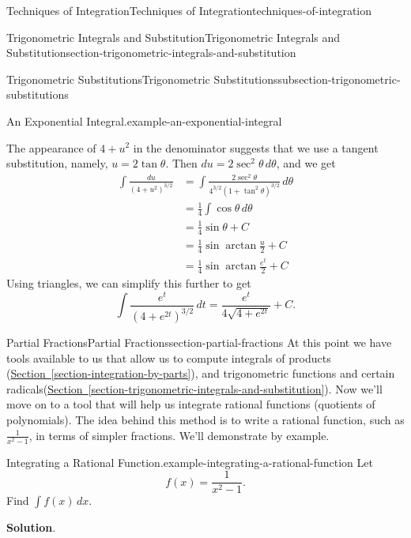 \documentclass[oneside,10pt,]{book}
\numberwithin{equation}{section}
\begin{document}
\begin{chapterptx}{Techniques of Integration}{}{Techniques of Integration}{}{}{techniques-of-integration}
\begin{sectionptx}{Trigonometric Integrals and Substitution}{}{Trigonometric Integrals and Substitution}{}{}{section-trigonometric-integrals-and-substitution}
\begin{subsectionptx}{Trigonometric Substitutions}{}{Trigonometric Substitutions}{}{}{subsection-trigonometric-substitutions}
\begin{example}{An Exponential Integral.}{example-an-exponential-integral}
\begin{equation*}
\end{equation*}
%
\par
\hypertarget{p-548}{}%
The appearance of \(4 + u^{2}\) in the denominator suggests that we use a tangent substitution, namely, \(u = 2\tan\theta\). Then \(du = 2\sec^{2}\theta\,d\theta\), and we get%
\begin{align*}
\int\frac{du}{(4 + u^{2})^{3/2}} & = \int\frac{2\sec^{2}\theta}{4^{3/2}(1 + \tan^{2}\theta)^{3/2}}\,d\theta \\
& = \frac{1}{4}\int\cos\theta\,d\theta \\
& = \frac{1}{4}\sin\theta + C \\
& = \frac{1}{4}\sin\arctan\frac{u}{2} + C \\
& = \frac{1}{4}\sin\arctan\frac{e^{t}}{2} + C 
\end{align*}
Using triangles, we can simplify this further to get%
\begin{equation*}
\int\frac{e^{t}}{(4 + e^{2t})^{3/2}}\,dt = \frac{e^{t}}{4\sqrt{4 + e^{2t}}} + C.
\end{equation*}
%
\end{example}
\end{subsectionptx}
\end{sectionptx}
%
%
\typeout{************************************************}
\typeout{************************************************}
%
\begin{sectionptx}{Partial Fractions}{}{Partial Fractions}{}{}{section-partial-fractions}
\hypertarget{p-549}{}%
At this point we have tools available to us that allow us to compute integrals of products (\hyperref[section-integration-by-parts]{Section~\ref{section-integration-by-parts}}), and trigonometric functions and certain radicals(\hyperref[section-trigonometric-integrals-and-substitution]{Section~\ref{section-trigonometric-integrals-and-substitution}}). Now we'll move on to a tool that will help us integrate rational functions (quotients of polynomials). The idea behind this method is to write a rational function, such as \(\frac{1}{x^{2} - 1}\), in terms of simpler fractions. We'll demonstrate by example.%
\begin{example}{Integrating a Rational Function.}{example-integrating-a-rational-function}%
\hypertarget{p-550}{}%
Let%
\begin{equation*}
f(x) = \frac{1}{x^{2} - 1}.
\end{equation*}
Find \(\int f(x)\,dx\).%
\par\smallskip%
\noindent\textbf{Solution}.\hypertarget{solution-121}{}\quad%

\end{example}
\end{sectionptx}
\end{chapterptx}
\end{document}
